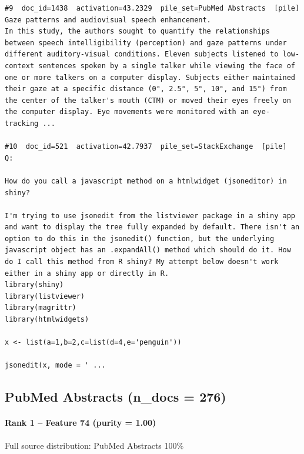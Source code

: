 \begin{verbatim}
#9  doc_id=1438  activation=43.2329  pile_set=PubMed Abstracts  [pile]
Gaze patterns and audiovisual speech enhancement.
In this study, the authors sought to quantify the relationships between speech intelligibility (perception) and gaze patterns under different auditory-visual conditions. Eleven subjects listened to low-context sentences spoken by a single talker while viewing the face of one or more talkers on a computer display. Subjects either maintained their gaze at a specific distance (0°, 2.5°, 5°, 10°, and 15°) from the center of the talker's mouth (CTM) or moved their eyes freely on the computer display. Eye movements were monitored with an eye-tracking ...

#10  doc_id=521  activation=42.7937  pile_set=StackExchange  [pile]
Q:

How do you call a javascript method on a htmlwidget (jsoneditor) in shiny?

I'm trying to use jsonedit from the listviewer package in a shiny app and want to display the tree fully expanded by default. There isn't an option to do this in the jsonedit() function, but the underlying javascript object has an .expandAll() method which should do it. How do I call this method from R shiny? My attempt below doesn't work either in a shiny app or directly in R.
library(shiny)
library(listviewer)
library(magrittr)
library(htmlwidgets)

x <- list(a=1,b=2,c=list(d=4,e='penguin'))

jsonedit(x, mode = ' ...

\end{verbatim}

\subsection*{PubMed Abstracts (n\_docs = 276)}

\paragraph*{Rank 1 -- Feature 74 (purity = 1.00)}

Full source distribution: PubMed Abstracts 100\%


